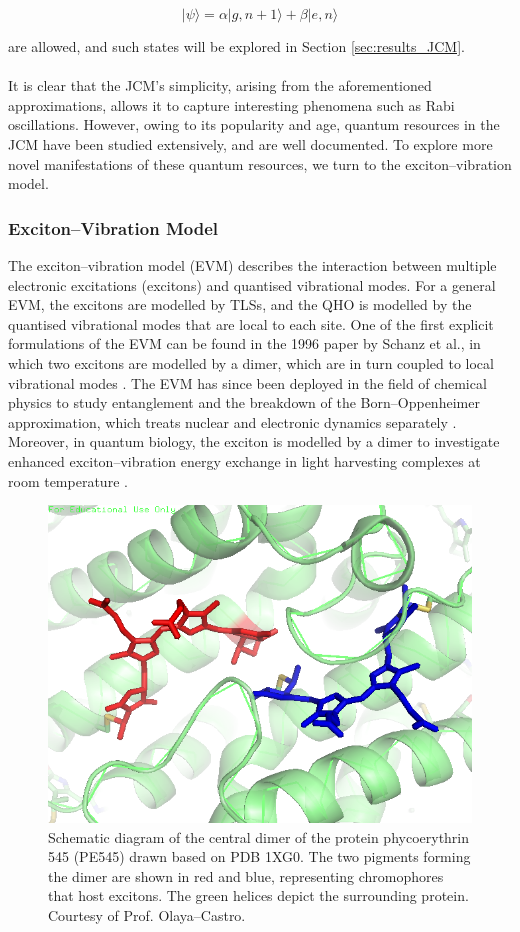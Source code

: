 \documentclass[11pt]{article}
\begin{document}
\begin{equation} \label{JCM_general_state}
    |\psi\rangle = \alpha|g,n+1\rangle + \beta|e,n\rangle
\end{equation} 

are allowed, and such states will be explored in Section \ref{sec:results_JCM}.\\
\\
It is clear that the JCM's simplicity, arising from the aforementioned approximations, allows it to capture interesting phenomena such as Rabi oscillations. However, owing to its popularity and age, quantum resources in the JCM have been studied extensively, and are well documented. To explore more novel manifestations of these quantum resources, we turn to the exciton--vibration model. 

\subsubsection{Exciton--Vibration Model}  \label{sec:theory_subsub_EVM}
The exciton--vibration model (EVM) describes the interaction between multiple electronic excitations (excitons) and quantised vibrational modes. For a general EVM, the excitons are modelled by TLSs, and the QHO is modelled by the quantised vibrational modes that are local to each site. One of the first explicit formulations of the EVM can be found in the 1996 paper by Schanz et al., in which two excitons are modelled by a dimer, which are in turn coupled to local vibrational modes \cite{ExVib1997-First}. The EVM has since been deployed in the field of chemical physics to study entanglement and the breakdown of the Born--Oppenheimer approximation, which treats nuclear and electronic dynamics separately \cite{ExVib2015-ChemPhysBorn}. Moreover, in quantum biology, the exciton is modelled by a dimer to investigate enhanced exciton--vibration energy exchange in light harvesting complexes at room temperature \cite{ExVib2014-Alexandra}.\\

\begin{figure}[H]
    \centering
    \includegraphics[width=0.5\linewidth]{Images/PEB50dimer.png}
    \caption{Schematic diagram of the central dimer of the protein phycoerythrin 545 (PE545) drawn based on PDB 1XG0. The two pigments forming the dimer are shown in red and blue, representing chromophores that host excitons. The green helices depict the surrounding protein. Courtesy of Prof. Olaya--Castro.}
    \label{fig:dimer}
\end{figure}
\end{document}
